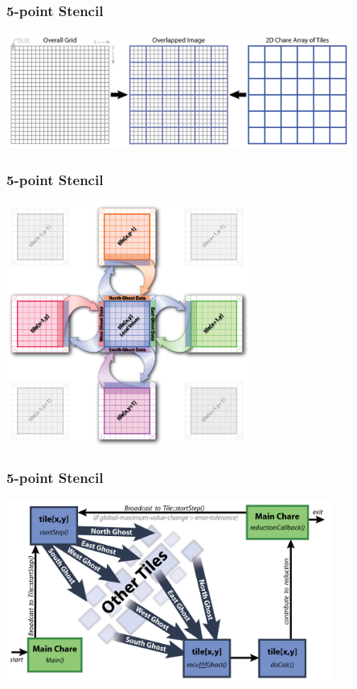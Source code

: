 \documentclass{beamer}
\begin{document}
\begin{frame}[fragile]
  \frametitle{5-point Stencil}
   \begin{center} \includegraphics[width=0.85\textwidth]{figures/2DJacobi_Decomposition.jpg} \end{center}
\end{frame}

\begin{frame}[fragile]
  \frametitle{5-point Stencil}
   \begin{center} \includegraphics[width=0.6\textwidth]{figures/2DJacobi_NeighborComm.jpg} \end{center}
\end{frame}

\begin{frame}[fragile]
  \frametitle{5-point Stencil}
   \begin{center} \includegraphics[width=0.8\textwidth]{figures/2DJacobi_LogicFlow.jpg} \end{center}
\end{frame}
\end{document}
